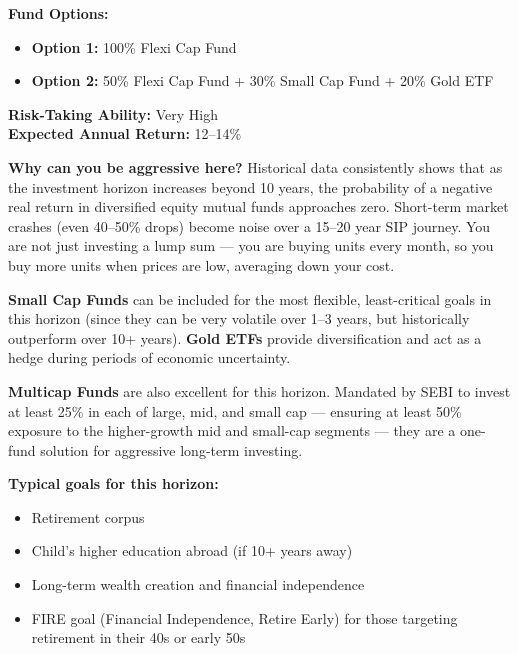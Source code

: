\documentclass[12pt,a4paper]{article}
\begin{document}
\begin{tcolorbox}[base, colback=VeryLong!8, colframe=VeryLong,
  colbacktitle=VeryLong, coltitle=white, fonttitle=\bfseries,
  title={Horizon 4: 10--25 Years --- Aggressive Long-Term Wealth}]

\textbf{Fund Options:}
\begin{itemize}
  \item \textbf{Option 1:} 100\% Flexi Cap Fund
  \item \textbf{Option 2:} 50\% Flexi Cap Fund + 30\% Small Cap Fund + 20\% Gold ETF
\end{itemize}
\textbf{Risk-Taking Ability:} Very High\\
\textbf{Expected Annual Return:} 12--14\%

\medskip
\textbf{Why can you be aggressive here?} Historical data consistently shows that as the investment horizon increases beyond 10 years, the probability of a negative real return in diversified equity mutual funds approaches zero. Short-term market crashes (even 40--50\% drops) become noise over a 15--20 year SIP journey. You are not just investing a lump sum --- you are buying units every month, so you buy more units when prices are low, averaging down your cost.

\medskip
\textbf{Small Cap Funds} can be included for the most flexible, least-critical goals in this horizon (since they can be very volatile over 1--3 years, but historically outperform over 10+ years). \textbf{Gold ETFs} provide diversification and act as a hedge during periods of economic uncertainty.

\medskip
\textbf{Multicap Funds} are also excellent for this horizon. Mandated by SEBI to invest at least 25\% in each of large, mid, and small cap --- ensuring at least 50\% exposure to the higher-growth mid and small-cap segments --- they are a one-fund solution for aggressive long-term investing.

\medskip
\textbf{Typical goals for this horizon:}
\begin{itemize}
  \item Retirement corpus
  \item Child's higher education abroad (if 10+ years away)
  \item Long-term wealth creation and financial independence
  \item FIRE goal (Financial Independence, Retire Early) for those targeting retirement in their 40s or early 50s
\end{itemize}
\end{tcolorbox}
\end{document}
